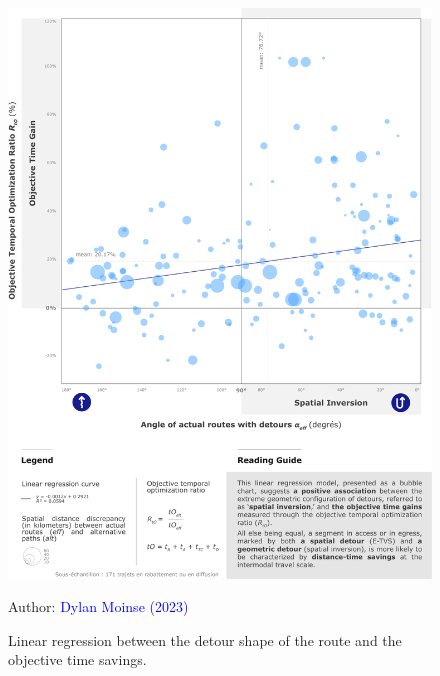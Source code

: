 \begin{refsegment}
    \begin{figure}[h!]\vspace*{4pt}
        \caption{Linear regression between the detour shape of the route and the objective time savings.}
        \label{fig-chap5:regression-detour-gain-temps}
        \centerline{\includegraphics[width=1\columnwidth]{src/Figures/Chap-5/EN_Detours_Ratios_angles.pdf}}
        \vspace{5pt}
        \begin{flushright}\scriptsize{
        Author: \textcolor{blue}{Dylan Moinse (2023)}
        }\end{flushright}
    \end{figure}


\end{refsegment}
